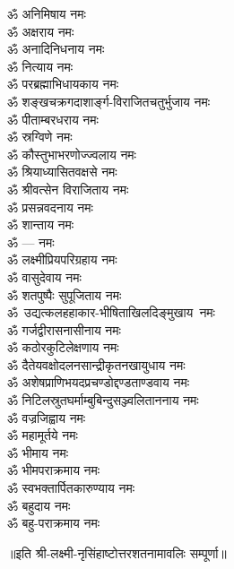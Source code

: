 \begin{multicols}{2}
\begin{flushleft}
ॐ अनिमिषाय नमः\\
ॐ अक्षराय नमः\hfill{}\\
ॐ अनादिनिधनाय नमः\\
ॐ नित्याय नमः\\
ॐ परब्रह्माभिधायकाय नमः\\
ॐ शङ्खचक्रगदाशार्ङ्ग-विराजितचतुर्भुजाय नमः\\
ॐ पीताम्बरधराय नमः\\
ॐ स्रग्विणे नमः\\
ॐ कौस्तुभाभरणोज्ज्वलाय नमः\\
ॐ श्रियाध्यासितवक्षसे नमः\\
ॐ श्रीवत्सेन विराजिताय नमः\\
ॐ प्रसन्नवदनाय नमः\hfill{}\\
ॐ शान्ताय नमः\\
ॐ --- नमः\\
ॐ लक्ष्मीप्रियपरिग्रहाय नमः\\
ॐ वासुदेवाय नमः\\
ॐ शतपुष्पैः सुपूजिताय नमः\\
ॐ~उद्यत्कलहहाकार-भीषिताखिलदिङ्मुखाय~नमः\\
ॐ गर्जद्वीरासनासीनाय नमः\\
ॐ कठोरकुटिलेक्षणाय नमः\\
ॐ दैतेयवक्षोदलनसान्द्रीकृतनखायुधाय नमः\\
ॐ अशेषप्राणिभयदप्रचण्डोद्दण्डताण्डवाय नमः\hfill{}\\
ॐ निटिलस्रुतघर्माम्बुबिन्दुसञ्ज्वलिताननाय नमः\\
ॐ वज्रजिह्वाय नमः\\
ॐ महामूर्तये नमः\\
ॐ भीमाय नमः\\
ॐ भीमपराक्रमाय नमः\\
ॐ स्वभक्तार्पितकारुण्याय नमः\\
ॐ बहुदाय नमः\\
ॐ बहु-पराक्रमाय नमः\hfill{}\\
\end{flushleft}
\end{multicols}
॥इति श्री-लक्ष्मी-नृसिंहाष्टोत्तरशतनामावलिः सम्पूर्णा॥
